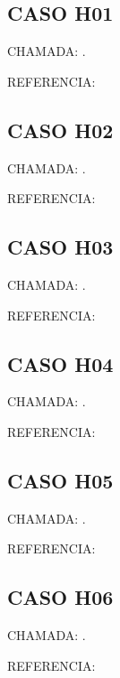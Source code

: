 \documentclass{undftex}
\begin{document}
\begin{refsection}\section*{CASO H01} CHAMADA: . \textcite{H01a}\par REFERENCIA:\par\printbibliography[heading=none,check=undfconsultadas]\end{refsection}\clearpage
\begin{refsection}\section*{CASO H02} CHAMADA: . \textcite{H02a}\par REFERENCIA:\par\printbibliography[heading=none,check=undfconsultadas]\end{refsection}\clearpage
\begin{refsection}\section*{CASO H03} CHAMADA: . \textcite{H03a}\par REFERENCIA:\par\printbibliography[heading=none,check=undfconsultadas]\end{refsection}\clearpage
\begin{refsection}\section*{CASO H04} CHAMADA: . \textcite{H04a}\par REFERENCIA:\par\printbibliography[heading=none,check=undfconsultadas]\end{refsection}\clearpage
\begin{refsection}\section*{CASO H05} CHAMADA: . \textcite{H05a}\par REFERENCIA:\par\printbibliography[heading=none,check=undfconsultadas]\end{refsection}\clearpage
\begin{refsection}\section*{CASO H06} CHAMADA: . \textcite{H06a}\par REFERENCIA:\par\printbibliography[heading=none,check=undfconsultadas]\end{refsection}\clearpage
\end{document}
